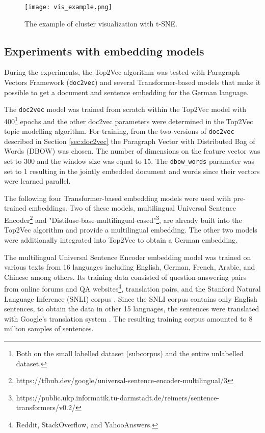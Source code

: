 \documentclass[fontsize=12pt,a4paper,twoside,openany]{scrbook}
\begin{document}
\begin{figure}[h]
\centering
\texttt{[image: vis\_example.png]}
\caption{The example of cluster visualization with t-SNE.}
\label{fig:cluster_vis}
\end{figure}


\subsection{Experiments with embedding models}
\label{sec:exp_emb}

During the experiments, the Top2Vec algorithm was tested with Paragraph Vectors Framework (\verb|doc2vec|) and several Transformer-based models that make it possible to get a document and sentence embedding for the German language.

The \verb|doc2vec| model was trained from scratch within the Top2Vec model with 400\footnote{Both on the small labelled dataset (subcorpus) and the entire unlabelled dataset.} epochs and the other doc2vec parameters were determined in the Top2Vec topic modelling algorithm. For training, from the two versions of \verb|doc2vec| described in Section \ref{sec:doc2vec} the Paragraph Vector with Distributed Bag of Words (DBOW) was chosen. The number of dimensions on the feature vector was set to 300 and the window size was equal to 15. The \verb|dbow_words| parameter was set to 1 resulting in the jointly embedded document and words since their vectors were learned parallel.

The following four Transformer-based embedding models were used with pre-trained embeddings. Two of these models, multilingual Universal Sentence Encoder\footnote{https://tfhub.dev/google/universal-sentence-encoder-multilingual/3} and "Distiluse-base-multilingual-cased"\footnote{https://public.ukp.informatik.tu-darmstadt.de/reimers/sentence-transformers/v0.2/}, are already built into the Top2Vec algorithm and provide a multilingual embedding. The other two models were additionally integrated into Top2Vec to obtain a German embedding.

The multilingual Universal Sentence Encoder embedding model was trained on various texts from 16 languages including English, German, French, Arabic, and Chinese among others. Its training data consisted of question-answering pairs from online forums and QA websites\footnote{Reddit, StackOverflow, and YahooAnswers.}, translation pairs, and the Stanford Natural Language Inference (SNLI) corpus \parencite{Cer18c}. Since the SNLI corpus contains only English sentences, to obtain the data in other 15 languages, the sentences were translated with Google's translation system \parencite{Cer18c}. The resulting training corpus amounted to 8 million samples of sentences.
\end{document}
